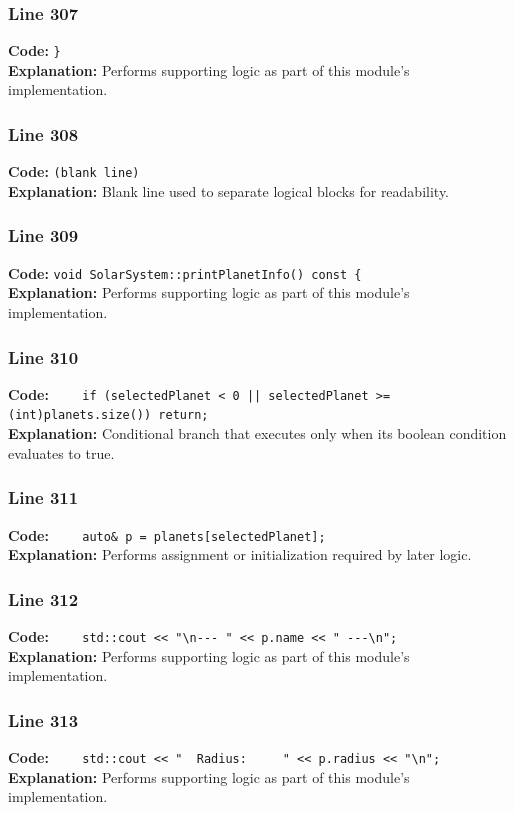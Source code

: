 \documentclass[11pt,a4paper]{article}
\begin{document}
\subsubsection*{Line 307}
\textbf{Code:} \verb|}|\\
\textbf{Explanation:} Performs supporting logic as part of this module's implementation.

\subsubsection*{Line 308}
\textbf{Code:} \texttt{(blank line)}\\
\textbf{Explanation:} Blank line used to separate logical blocks for readability.

\subsubsection*{Line 309}
\textbf{Code:} \verb|void SolarSystem::printPlanetInfo() const {|\\
\textbf{Explanation:} Performs supporting logic as part of this module's implementation.

\subsubsection*{Line 310}
\textbf{Code:} \verb!    if (selectedPlanet < 0 || selectedPlanet >= (int)planets.size()) return;!\\
\textbf{Explanation:} Conditional branch that executes only when its boolean condition evaluates to true.

\subsubsection*{Line 311}
\textbf{Code:} \verb|    auto& p = planets[selectedPlanet];|\\
\textbf{Explanation:} Performs assignment or initialization required by later logic.

\subsubsection*{Line 312}
\textbf{Code:} \verb|    std::cout << "\n--- " << p.name << " ---\n";|\\
\textbf{Explanation:} Performs supporting logic as part of this module's implementation.

\subsubsection*{Line 313}
\textbf{Code:} \verb|    std::cout << "  Radius:     " << p.radius << "\n";|\\
\textbf{Explanation:} Performs supporting logic as part of this module's implementation.
\end{document}
